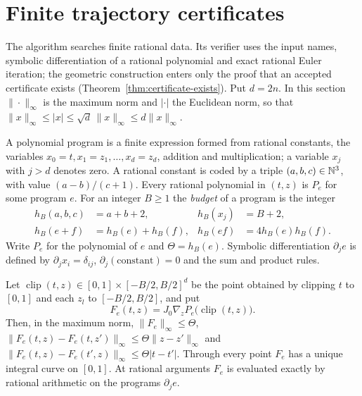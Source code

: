 \section{Finite trajectory certificates}\label{sec:certificate}

The algorithm searches finite rational data. Its verifier uses the input names, symbolic differentiation of a
rational polynomial and exact rational Euler iteration; the geometric construction enters only the proof that an
accepted certificate exists (Theorem~\ref{thm:certificate-exists}). Put $d=2n$. In this section
$\|\cdot\|_\infty$ is the maximum norm and $|\cdot|$ the Euclidean norm, so that
$\|x\|_\infty\le|x|\le\sqrt d\,\|x\|_\infty\le d\|x\|_\infty$.

\begin{definition}\label{def:certificate-program}
A polynomial program is a finite expression formed from rational constants, the variables
$x_0=t,x_1=z_1,\ldots,x_d=z_d$, addition and multiplication; a variable $x_j$ with $j>d$ denotes zero. A rational
constant is coded by a triple $(a,b,c)\in\mathbb{N}^3$, with value $(a-b)/(c+1)$. Every rational polynomial in $(t,z)$ is
$P_e$ for some program $e$. For an integer $B\ge1$ the \emph{budget} of a program is the integer
\begin{align*}
 h_B(a,b,c)&=a+b+2,& h_B(x_j)&=B+2,\\
 h_B(e+f)&=h_B(e)+h_B(f),& h_B(ef)&=4h_B(e)h_B(f).
\end{align*}
Write $P_e$ for the polynomial of $e$ and $\Theta=h_B(e)$. Symbolic differentiation $\partial_je$ is defined by
$\partial_jx_i=\delta_{ij}$, $\partial_j(\text{constant})=0$ and the sum and product rules.
\end{definition}

\begin{lemma}\label{lem:certificate-field}
Let $\operatorname{clip}(t,z)\in[0,1]\times[-B/2,B/2]^d$ be the point obtained by clipping $t$ to $[0,1]$ and each
$z_l$ to $[-B/2,B/2]$, and put
\[
 F_e(t,z)=J_0\nabla_zP_e\bigl(\operatorname{clip}(t,z)\bigr).
\]
Then, in the maximum norm, $\|F_e\|_\infty\le\Theta$,
$\|F_e(t,z)-F_e(t,z')\|_\infty\le\Theta\|z-z'\|_\infty$ and $\|F_e(t,z)-F_e(t',z)\|_\infty\le\Theta|t-t'|$. Through every
point $F_e$ has a unique integral curve on $[0,1]$. At rational arguments $F_e$ is evaluated exactly by rational
arithmetic on the programs $\partial_je$.
\end{lemma}

